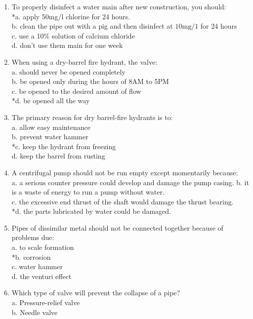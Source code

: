 \begin{enumerate}[1.]
\item To properly disinfect a water main after new construction, you should:\\
*a. apply 50mg/l chlorine for 24 hours.\\
b. clean the pipe out with a pig and then disinfect at $10 \mathrm{mg} / 1$ for 24 hours\\
c. use a 10\% solution of calcium chloride\\
d. don't use them main for one week\\
\item When using a dry-barrel fire hydrant, the valve:\\
a. should never be opened completely\\
b. be opened only during the hours of 8AM to 5PM\\
c. be opened to the desired amount of flow\\
*d. be opened all the way\\
\item The primary reason for dry barrel-fire hydrants is to:\\
a. allow easy maintenance\\
b. prevent water hammer\\
*c. keep the hydrant from freezing\\
d. keep the barrel from rusting\\
\item A centrifugal pump should not be run empty except momentarily because:\\
a. a serious counter pressure could develop and damage the pump casing. b. it is a waste of energy to run a pump without water.\\
c. the excessive end thrust of the shaft would damage the thrust bearing.\\
*d. the parts lubricated by water could be damaged.\\
\item Pipes of dissimilar metal should not be connected together because of problems due:\\
a. to scale formation\\
*b. corrosion\\
c. water hammer\\
d. the venturi effect\\
\item Which type of valve will prevent the collapse of a pipe?\\
a. Pressure-relief valve\\
b. Needle valve\\

\end{enumerate}
